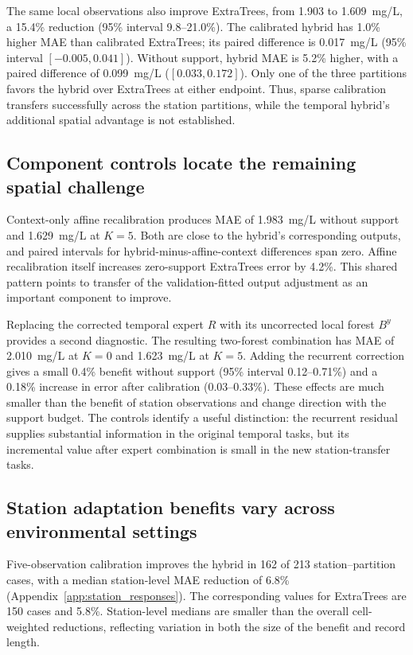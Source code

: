 \documentclass[11pt]{article}
\begin{document}
The same local observations also improve ExtraTrees, from 1.903 to 1.609~mg/L, a 15.4\% reduction (95\% interval 9.8--21.0\%). The calibrated hybrid has 1.0\% higher MAE than calibrated ExtraTrees; its paired difference is 0.017~mg/L (95\% interval $[-0.005,0.041]$). Without support, hybrid MAE is 5.2\% higher, with a paired difference of 0.099~mg/L ($[0.033,0.172]$). Only one of the three partitions favors the hybrid over ExtraTrees at either endpoint. Thus, sparse calibration transfers successfully across the station partitions, while the temporal hybrid's additional spatial advantage is not established.

\subsection{Component controls locate the remaining spatial challenge}
Context-only affine recalibration produces MAE of 1.983~mg/L without support and 1.629~mg/L at $K=5$. Both are close to the hybrid's corresponding outputs, and paired intervals for hybrid-minus-affine-context differences span zero. Affine recalibration itself increases zero-support ExtraTrees error by 4.2\%. This shared pattern points to transfer of the validation-fitted output adjustment as an important component to improve.

Replacing the corrected temporal expert $R$ with its uncorrected local forest $B^y$ provides a second diagnostic. The resulting two-forest combination has MAE of 2.010~mg/L at $K=0$ and 1.623~mg/L at $K=5$. Adding the recurrent correction gives a small 0.4\% benefit without support (95\% interval 0.12--0.71\%) and a 0.18\% increase in error after calibration (0.03--0.33\%). These effects are much smaller than the benefit of station observations and change direction with the support budget. The controls identify a useful distinction: the recurrent residual supplies substantial information in the original temporal tasks, but its incremental value after expert combination is small in the new station-transfer tasks.

\subsection{Station adaptation benefits vary across environmental settings}
Five-observation calibration improves the hybrid in 162 of 213 station--partition cases, with a median station-level MAE reduction of 6.8\% (Appendix~\ref{app:station_responses}). The corresponding values for ExtraTrees are 150 cases and 5.8\%. Station-level medians are smaller than the overall cell-weighted reductions, reflecting variation in both the size of the benefit and record length.
\end{document}
